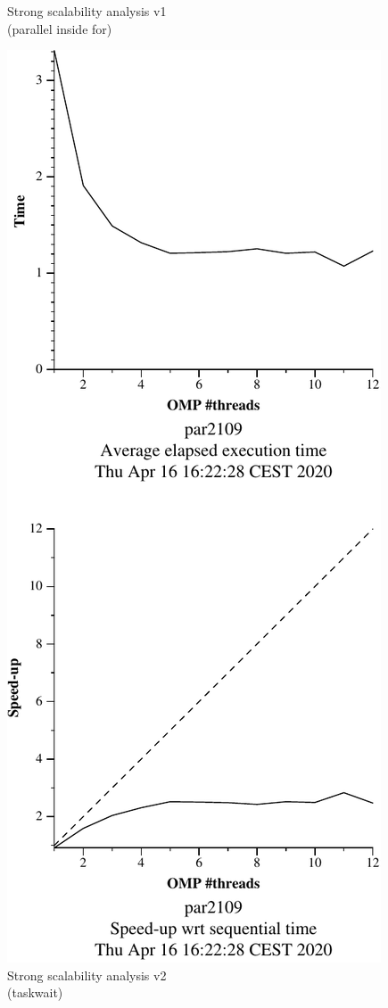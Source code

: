 \begin{figure}[H]
\begin{minipage}{0.5\textwidth}
        \caption{Strong scalability analysis v1 \\ (parallel inside for)}
        \label{fig:ssa_v1} 
    \end{minipage}
    \begin{minipage}{0.5\textwidth}
        \centering
        \includegraphics[width=0.7\linewidth]{plots/v2-crop.pdf}
        \caption{Strong scalability analysis v2 \\ (taskwait)}
        \label{fig:ssa_v2} 
    \end{minipage}
\end{figure}

